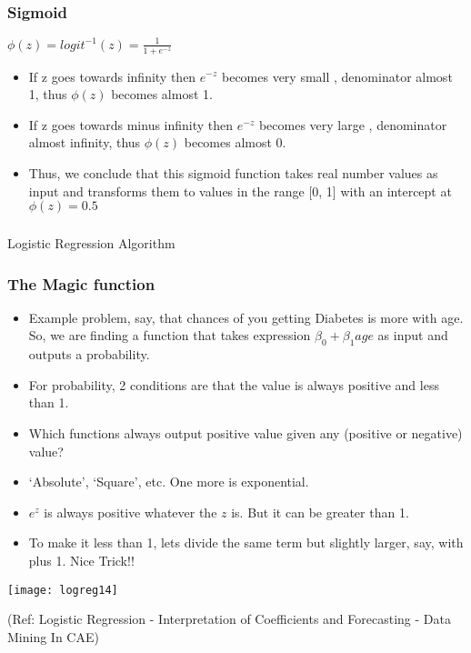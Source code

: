 \begin{frame}[fragile]\frametitle{Sigmoid}
$\phi(z) = logit^{-1}(z) = \frac{1}{1+ e^{-z}}$
 \begin{itemize}
\item If z goes towards infinity then $e^{-z}$ becomes very small , denominator almost 1, thus $\phi(z)$ becomes almost 1. 
\item If z goes towards minus infinity then $e^{-z}$ becomes very large , denominator almost infinity, thus $\phi(z)$ becomes almost 0. 
\item Thus, we conclude that this sigmoid function takes real number values as input and transforms them to values in 
the range [0, 1] with an intercept at  $\phi (z) = 0.5$
\end{itemize}
\end{frame}


\begin{frame}[fragile]\frametitle{}
\begin{center}
{\Large Logistic Regression Algorithm}
\end{center}
\end{frame}

\begin{frame}[fragile]\frametitle{The Magic function}
 \begin{itemize}
\item Example problem, say, that chances of you getting Diabetes is more with age. So, we are finding a function that takes expression $\beta_0 + \beta_1 age$ as input and outputs a probability.
\item For probability, 2 conditions are that the value is always positive and less than 1.
\item Which functions always output positive value given any (positive or negative) value?
\item `Absolute', `Square', etc. One more is exponential.
\item $e^z$ is always positive whatever the $z$ is. But it can be greater than 1.
\item To make it less than 1, lets divide the same term but slightly larger, say, with plus 1. Nice Trick!!
\end{itemize}

\begin{center}
\texttt{[image: logreg14]}
\end{center}

{\tiny (Ref: Logistic Regression - Interpretation of Coefficients and Forecasting - Data Mining In CAE)}

\end{frame}


